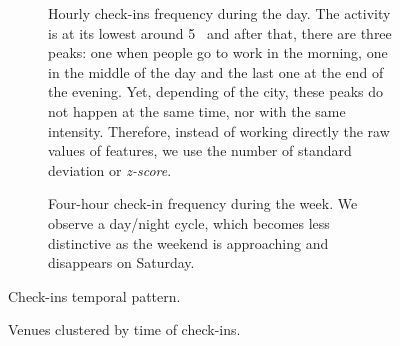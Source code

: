\begin{figure}[hbt]
    \begin{subfigure}[b]{\textwidth}
    \centering
    \iftoggle{EXTERNALPGF}{%
        \texttt{[image: daily\_checkin]}
    }{%
        
    }
	\caption[Pattern of check-in during the day]{Hourly check-ins frequency
		during the day. The activity is at its lowest around 5 \am\ and after
		that, there are three peaks: one when people go to work in the morning,
		one in the middle of the day and the last one at the end of the
		evening. Yet, depending of the city, these peaks do not happen at the
		same time, nor with the same intensity. Therefore, instead of working
		directly the raw values of features, we use the number of standard
		deviation or \emph{z-score}.\label{fig:daily_checkin}}
    \end{subfigure}

    \begin{subfigure}[b]{\textwidth}
    \centering
    \iftoggle{EXTERNALPGF}{%
        \texttt{[image: weekly\_checkin]}
    }{%
        
    }
	\caption[Pattern of check-in during the week]{Four-hour check-in frequency
	during the week. We observe a day/night cycle, which becomes less
	distinctive as the weekend is approaching and disappears on
	Saturday.\label{fig:weekly_checkin}}
    \end{subfigure}
    \caption{Check-ins temporal pattern.\label{fig:time_checkin}}
\end{figure}

\begin{figure}[hbt]
    \begin{subfigure}[b]{\textwidth}
    \centering
    \iftoggle{EXTERNALPGF}{\texttt{[image: day\_cluster\_3h]}}{}
    \end{subfigure}

    \begin{subfigure}[b]{\textwidth}
    \centering
    \iftoggle{EXTERNALPGF}{\texttt{[image: day\_cluster\_4h]}}{}
    \end{subfigure}
    \caption[Venues clustered by time of check-ins]{Venues clustered by time
    of check-ins. \label{fig:day_cluster}}
\end{figure}

